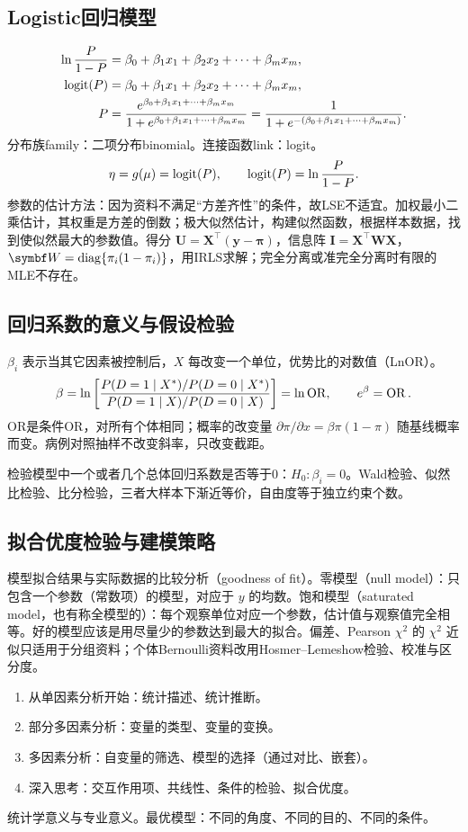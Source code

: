 \subsection{Logistic回归模型}
\begin{align*}
\ln\frac{P}{1-P}&=\beta_0+\beta_1x_1+\beta_2x_2+\cdots+\beta_mx_m,\\
\operatorname{logit}(P)&=\beta_0+\beta_1x_1+\beta_2x_2+\cdots+\beta_mx_m,\\
P&=\frac{e^{\beta_0+\beta_1x_1+\cdots+\beta_mx_m}}{1+e^{\beta_0+\beta_1x_1+\cdots+\beta_mx_m}}
 =\frac1{1+e^{-(\beta_0+\beta_1x_1+\cdots+\beta_mx_m)}}.
\end{align*}
分布族family：二项分布binomial。连接函数link：logit。
\[
\eta=g(\mu)=\operatorname{logit}(P),\qquad\operatorname{logit}(P)=\ln\frac{P}{1-P}.
\]
参数的估计方法：因为资料不满足“方差齐性”的条件，故LSE不适宜。加权最小二乘估计，其权重是方差的倒数；极大似然估计，构建似然函数，根据样本数据，找到使似然最大的参数值。得分 $\bm U=\bm X^\top(\bm y-\bm\pi)$，信息阵 $\bm I=\bm X^\top\bm W\bm X$，$\bm W=\diag\{\pi_i(1-\pi_i)\}$，用IRLS求解；完全分离或准完全分离时有限的MLE不存在。
\subsection{回归系数的意义与假设检验}
$\beta_i$ 表示当其它因素被控制后，$X$ 每改变一个单位，优势比的对数值（LnOR）。
\[
\beta=\ln\left[\frac{P(D=1\mid X^*)/P(D=0\mid X^*)}{P(D=1\mid X)/P(D=0\mid X)}\right]=\ln\operatorname{OR},\qquad e^\beta=\operatorname{OR}.
\]
OR是条件OR，对所有个体相同；概率的改变量 $\partial\pi/\partial x=\beta\pi(1-\pi)$ 随基线概率而变。病例对照抽样不改变斜率，只改变截距。

检验模型中一个或者几个总体回归系数是否等于0：$H_0:\beta_i=0$。Wald检验、似然比检验、比分检验，三者大样本下渐近等价，自由度等于独立约束个数。
\subsection{拟合优度检验与建模策略}
模型拟合结果与实际数据的比较分析（goodness of fit）。零模型（null model）：只包含一个参数（常数项）的模型，对应于 $y$ 的均数。饱和模型（saturated model，也有称全模型的）：每个观察单位对应一个参数，估计值与观察值完全相等。好的模型应该是用尽量少的参数达到最大的拟合。偏差、Pearson $\chi^2$ 的 $\chi^2$ 近似只适用于分组资料；个体Bernoulli资料改用Hosmer--Lemeshow检验、校准与区分度。
\begin{enumerate}
\item 从单因素分析开始：统计描述、统计推断。
\item 部分多因素分析：变量的类型、变量的变换。
\item 多因素分析：自变量的筛选、模型的选择（通过对比、嵌套）。
\item 深入思考：交互作用项、共线性、条件的检验、拟合优度。
\end{enumerate}
统计学意义与专业意义。最优模型：不同的角度、不同的目的、不同的条件。

